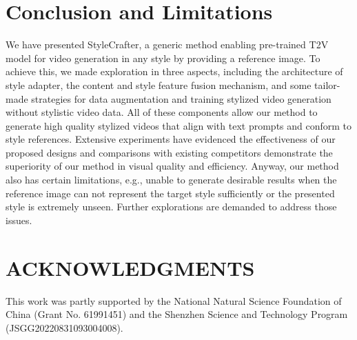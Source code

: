 \section{Conclusion and Limitations}
\label{sec:conclusion}

We have presented StyleCrafter, a generic method enabling pre-trained T2V model for video generation in any style by providing a reference image. To achieve this, we made exploration in three aspects, including the architecture of style adapter, the content and style feature fusion mechanism, and some tailor-made strategies for data augmentation and training stylized video generation without stylistic video data.  
All of these components allow our method to generate high quality stylized videos that align with text prompts and conform to style references.
Extensive experiments have evidenced the effectiveness of our proposed designs and comparisons with existing competitors demonstrate the superiority of our method in visual quality and efficiency.
Anyway, our method also has certain limitations, e.g., unable to generate desirable results when the reference image can not represent the target style sufficiently or the presented style is extremely unseen. Further explorations are demanded to address those issues.

\section*{ACKNOWLEDGMENTS}
This work was partly supported by the National Natural Science Foundation of China  (Grant No. 61991451) and the Shenzhen Science and Technology Program (JSGG20220831093004008).